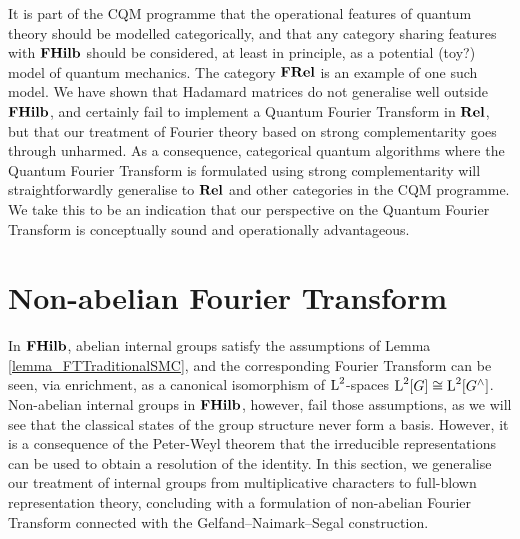 It is part of the CQM programme that the operational features of quantum theory should be modelled categorically, and that any category sharing features with $\mathbf{FHilb}$ should be considered, at least in principle, as a potential (toy?) model of quantum mechanics. The category $\mathbf{FRel}$ is an example of one such model. We have shown that Hadamard matrices do not generalise well outside $\mathbf{FHilb}$, and certainly fail to implement a Quantum Fourier Transform in $\mathbf{Rel}$, but that our treatment of Fourier theory based on strong complementarity goes through unharmed. As a consequence, categorical quantum algorithms where the Quantum Fourier Transform is formulated using strong complementarity will straightforwardly generalise to $\mathbf{Rel}$ and other categories in the CQM programme. We take this to be an indication that our perspective on the Quantum Fourier Transform is conceptually sound and operationally advantageous.

\subsection{}
\label{section_NonAbelianFourierTransform}

\section{Non-abelian Fourier Transform}
\label{section_NonAbelianFourierTransform}

In $\mathbf{FHilb}$, abelian internal groups satisfy the assumptions of Lemma \ref{lemma_FTTraditionalSMC}, and the corresponding Fourier Transform can be seen, via enrichment, as a canonical isomorphism of $\operatorname{L}^2$-spaces $\operatorname{L}^2[G] \cong \operatorname{L}^2[G^\wedge]$. Non-abelian internal groups in $\mathbf{FHilb}$, however, fail those assumptions, as we will see that the classical states of the group structure never form a basis. However, it is a consequence of the Peter-Weyl theorem that the irreducible representations can be used to obtain a resolution of the identity. In this section, we generalise our treatment of internal groups from multiplicative characters to full-blown representation theory, concluding with a formulation of non-abelian Fourier Transform connected with the Gelfand--Naimark--Segal construction.

